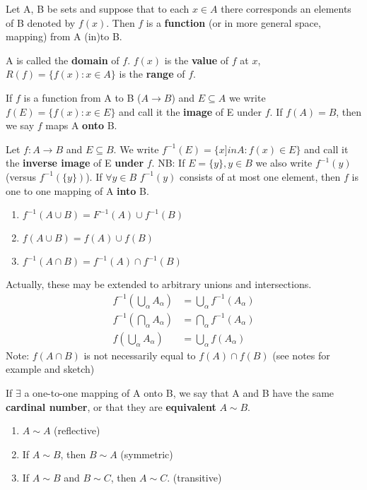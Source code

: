 \documentclass[11pt,fleqn]{book} %
\begin{document}
\begin{definition}
	Let A, B be sets and suppose that to each $x \in A$ there corresponds an elements of B denoted by $f(x)$. Then $f$ is a \textbf{function} (or in more general space, mapping) from A (in)to B. 

	A is called the \textbf{domain} of $f$. $f(x)$ is the \textbf{value} of $f$ at $x$, $R(f) = \{f(x): x \in A\}$ is the \textbf{range} of $f$.
\end{definition}

\begin{definition}[Image]
	If $f$ is a function from A to B ($A \rightarrow B$) and $E \subseteq A$ we write $f(E) = \{f(x): x \in E\}$ and call it the \textbf{image} of E under $f$.
	If $f(A) = B$, then we say $f$ maps A \textbf{onto} B.
\end{definition}

\begin{definition}
	Let $f: A \rightarrow B$ and $E \subseteq B$. We write $f^{-1}(E) = \{x ]in A : f(x) \in E\}$ and call it the \textbf{inverse image} of E \textbf{under} $f$.
	NB: If $E =\{y\}, y \in B$ we also write $f^{-1}(y)$ (versus $f^{-1}(\{y\})$). If $\forall y \in B$ $f^{-1}(y)$ consists of at most one element, then $f$ is one to one mapping of A \textbf{into} B.
\end{definition}

\begin{theorem}  
	\begin{enumerate}[label = \alph*)]
		\item $f^{-1}(A\cup B) = F^{-1}(A)\cup f^{-1}(B)$
		\item $f(A\cup B) = f(A) \cup f(B)$
		\item $f^{-1}(A\cap B) = f^{-1}(A) \cap f^{-1}(B)$
	\end{enumerate}
	Actually, these may be extended to arbitrary unions and intersections.
	\begin{align*}	
		f^{-1}(\bigcup\limits_\alpha A_\alpha) &= \bigcup_\alpha f^{-1}(A_\alpha)\\
		f^{-1} (\bigcap_\alpha A_\alpha) &= \bigcap_\alpha f^{-1}(A_\alpha)\\
		f(\bigcup_\alpha A_\alpha) &= \bigcup_\alpha f(A_\alpha)
	\end{align*}	
	Note: $f(A\cap B)$ is not necessarily equal to $f(A) \cap f(B)$ (see notes for example and sketch)
\end{theorem}

\begin{definition}
	If $\exists$ a one-to-one mapping of A onto B, we say that A and B have the same \textbf{cardinal number}, or that they are \textbf{equivalent} $A\sim B$.  
	\begin{enumerate}[label = \alph*)]
		\item $A \sim A$ (reflective)
		\item If $A \sim B$, then $B \sim A$ (symmetric)
		\item If $A \sim B$ and $B \sim C$, then $A \sim C$. (transitive)
	\end{enumerate}
\end{definition}
\end{document}
